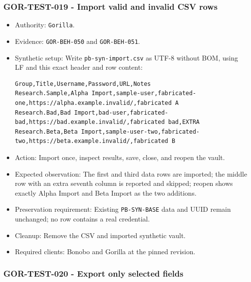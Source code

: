 \documentclass[
  letterpaper,
]{article}
\newcommand{\passthrough}[1]{#1}
\begin{document}
\subsubsection{GOR-TEST-019 - Import valid and invalid CSV rows}\label{gor-test-019---import-valid-and-invalid-csv-rows}

\begin{itemize}
\item
  Authority: \passthrough{\lstinline!Gorilla!}.
\item
  Evidence: \nolinkurl{GOR-BEH-050} and \nolinkurl{GOR-BEH-051}.
\item
  Synthetic setup: Write \nolinkurl{pb-syn-import.csv} as UTF-8 without BOM, using LF and this exact header and row
  content:

\begin{lstlisting}
Group,Title,Username,Password,URL,Notes
Research.Sample,Alpha Import,sample-user,fabricated-one,https://alpha.example.invalid/,fabricated A
Research.Bad,Bad Import,bad-user,fabricated-bad,https://bad.example.invalid/,fabricated bad,EXTRA
Research.Beta,Beta Import,sample-user-two,fabricated-two,https://beta.example.invalid/,fabricated B
\end{lstlisting}
\item
  Action: Import once, inspect results, save, close, and reopen the vault.
\item
  Expected observation: The first and third data rows are imported; the middle row with an extra seventh column is
  reported and skipped; reopen shows exactly Alpha Import and Beta Import as the two additions.
\item
  Preservation requirement: Existing \nolinkurl{PB-SYN-BASE} data and UUID remain unchanged; no row contains a real
  credential.
\item
  Cleanup: Remove the CSV and imported synthetic vault.
\item
  Required clients: Bonobo and Gorilla at the pinned revision.
\end{itemize}

\subsubsection{GOR-TEST-020 - Export only selected fields}\label{gor-test-020---export-only-selected-fields}
\end{document}
